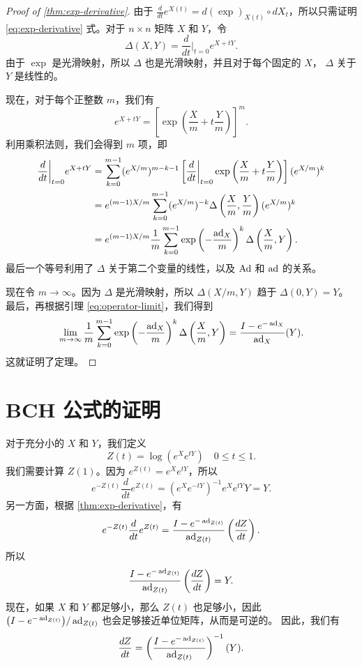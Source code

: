 \begin{proof}[Proof of \ref{thm:exp-derivative}]
  由于 $\frac{d}{dt}e^{X(t)}=d(\exp)_{X(t)}\circ dX_t$，所以只需证明
  \eqref{eq:exp-derivative} 式。对于 $n\times n$ 矩阵 $X$ 和 $Y$，令
  \[
    \Delta (X,Y)=\frac{d}{dt}\bigg|_{t=0}e^{X+tY}.
  \]
  由于 $\exp$ 是光滑映射，所以 $\Delta$ 也是光滑映射，并且对于每个固定的 $X$，
  $\Delta$ 关于 $Y$ 是线性的。

  现在，对于每个正整数 $m$，我们有
  \[
    e^{X+tY}=\left[
      \exp\left(
        \frac{X}{m}+t\frac{Y}{m}
      \right)
    \right]^m.
  \]
  利用乘积法则，我们会得到 $m$ 项，即
  \begin{align*}
    \frac{d}{dt}\bigg|_{t=0}e^{X+tY}&=\sum_{k=0}^{m-1}
    (e^{X/m})^{m-k-1}\left[
      \frac{d}{dt}\bigg|_{t=0}\exp\left(
        \frac{X}{m}+t\frac{Y}{m}
      \right)
    \right](e^{X/m})^k\\
    &=e^{(m-1)X/m}\sum_{k=0}^{m-1}(e^{X/m})^{-k}
    \Delta\left(
      \frac{X}{m},\frac{Y}{m}
    \right)(e^{X/m})^k\\
    &=e^{(m-1)X/m}\frac{1}{m}\sum_{k=0}^{m-1}
    \exp\left(-\frac{\operatorname{ad}_X}{m }\right)^k\Delta\left(\frac{X}{m},Y\right).
  \end{align*}
  最后一个等号利用了 $\Delta$ 关于第二个变量的线性，以及 $\operatorname{Ad}$
  和 $\operatorname{ad}$ 的关系。

  现在令 $m\to\infty$。因为 $\Delta$ 是光滑映射，所以 $\Delta(X/m,Y)$ 
  趋于 $\Delta(0,Y)=Y$。最后，再根据引理 \eqref{eq:operator-limit}，我们得到
  \[
    \lim_{m\to\infty}\frac{1}{m}\sum_{k=0}^{m-1}
    \exp\left(-\frac{\operatorname{ad}_X}{m }\right)^k\Delta\left(\frac{X}{m},Y\right)
    =\frac{I-e^{-\operatorname{ad}_X}}{\operatorname{ad}_X}(Y).
  \]
  这就证明了定理。
\end{proof}

\section{BCH 公式的证明}

对于充分小的 $X$ 和 $Y$，我们定义
\[
  Z(t)=\log(e^Xe^{tY})\quad 0\leq t\leq 1.
\]
我们需要计算 $Z(1)$。因为 $e^{Z(t)}=e^Xe^{tY}$，所以
\[
  e^{-Z(t)}\frac{d}{dt}e^{Z(t)}=(e^Xe^{-tY})^{-1}e^Xe^{tY}Y=Y.
\]
另一方面，根据 \autoref{thm:exp-derivative}，有
\[
  e^{-Z(t)}\frac{d}{dt}e^{Z(t)}=\frac{I-e^{-\operatorname{ad}_{Z(t)}}}{\operatorname{ad}_{Z(t)}}
  \left(\frac{d Z}{dt}\right).
\]
所以
\[
  \frac{I-e^{-\operatorname{ad}_{Z(t)}}}{\operatorname{ad}_{Z(t)}}
  \left(\frac{d Z}{dt}\right)
  =Y.
\]
现在，如果 $X$ 和 $Y$ 都足够小，那么 $Z(t)$ 也足够小，因此
$\bigl(I-e^{-\operatorname{ad}_{Z(t)}}\bigr)/\operatorname{ad}_{Z(t)}$ 也会足够接近单位矩阵，从而是可逆的。
因此，我们有
\begin{equation}\label{eq:dZ/dt}
  \frac{d Z}{dt}=\left(
    \frac{I-e^{-\operatorname{ad}_{Z(t)}}}{\operatorname{ad}_{Z(t)}}
  \right)^{-1}(Y).
\end{equation}

